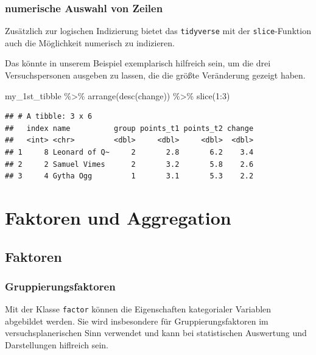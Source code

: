 \documentclass[
]{book}
\newenvironment{Shaded}{\begin{snugshade}}{\end{snugshade}}
\newcommand{\DecValTok}[1]{\textcolor[rgb]{0.00,0.00,0.81}{#1}}
\newcommand{\FunctionTok}[1]{\textcolor[rgb]{0.00,0.00,0.00}{#1}}
\newcommand{\NormalTok}[1]{#1}
\newcommand{\SpecialCharTok}[1]{\textcolor[rgb]{0.00,0.00,0.00}{#1}}
\begin{document}
\hypertarget{numerische-auswahl-von-zeilen}{%
\subsection{numerische Auswahl von Zeilen}\label{numerische-auswahl-von-zeilen}}

Zusätzlich zur logischen Indizierung bietet das \texttt{tidyverse} mit der \texttt{slice}-Funktion auch die Möglichkeit numerisch zu indizieren.

Das könnte in unserem Beispiel exemplarisch hilfreich sein, um die drei Versuchspersonen ausgeben zu lassen, die die größte Veränderung gezeigt haben.

\begin{Shaded}
\begin{Highlighting}[]
\NormalTok{my\_1st\_tibble }\SpecialCharTok{\%\textgreater{}\%} 
  \FunctionTok{arrange}\NormalTok{(}\FunctionTok{desc}\NormalTok{(change)) }\SpecialCharTok{\%\textgreater{}\%} 
  \FunctionTok{slice}\NormalTok{(}\DecValTok{1}\SpecialCharTok{:}\DecValTok{3}\NormalTok{)}
\end{Highlighting}
\end{Shaded}

\begin{verbatim}
## # A tibble: 3 x 6
##   index name          group points_t1 points_t2 change
##   <int> <chr>         <dbl>     <dbl>     <dbl>  <dbl>
## 1     8 Leonard of Q~     2       2.8       6.2    3.4
## 2     2 Samuel Vimes      2       3.2       5.8    2.6
## 3     4 Gytha Ogg         1       3.1       5.3    2.2
\end{verbatim}

\hypertarget{faktoren-und-aggregation}{%
\chapter{Faktoren und Aggregation}\label{faktoren-und-aggregation}}

\hypertarget{faktoren}{%
\section{Faktoren}\label{faktoren}}

\hypertarget{gruppierungsfaktoren}{%
\subsection{Gruppierungsfaktoren}\label{gruppierungsfaktoren}}

Mit der Klasse \texttt{factor} können die Eigenschaften kategorialer Variablen abgebildet werden. Sie wird insbesondere für Gruppierungsfaktoren im versuchsplanerischen Sinn verwendet und kann bei statistischen Auswertung und Darstellungen hiflreich sein.
\end{document}
